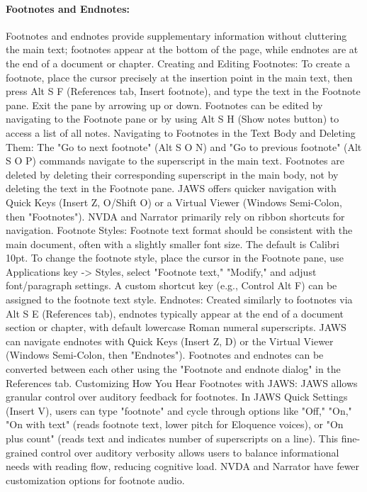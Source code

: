 \paragraph{Footnotes and Endnotes:}
Footnotes and endnotes provide supplementary information without cluttering the main text; footnotes appear at the bottom of the page, while endnotes are at the end of a document or chapter.\supercite{kingsbury2025}
Creating and Editing Footnotes: To create a footnote, place the cursor precisely at the insertion point in the main text, then press Alt S F (References tab, Insert footnote), and type the text in the Footnote pane. Exit the pane by arrowing up or down.\supercite{kingsbury2025} Footnotes can be edited by navigating to the Footnote pane or by using Alt S H (Show notes button) to access a list of all notes.\supercite{kingsbury2025}
Navigating to Footnotes in the Text Body and Deleting Them: The "Go to next footnote" (Alt S O N) and "Go to previous footnote" (Alt S O P) commands navigate to the superscript in the main text. Footnotes are deleted by deleting their corresponding superscript in the main body, not by deleting the text in the Footnote pane.\supercite{kingsbury2025} JAWS offers quicker navigation with Quick Keys (Insert Z, O/Shift O) or a Virtual Viewer (Windows Semi-Colon, then "Footnotes").\supercite{kingsbury2025} NVDA and Narrator primarily rely on ribbon shortcuts for navigation.\supercite{kingsbury2025}
Footnote Styles: Footnote text format should be consistent with the main document, often with a slightly smaller font size. The default is Calibri 10pt.\supercite{kingsbury2025} To change the footnote style, place the cursor in the Footnote pane, use Applications key -\textgreater{} Styles, select "Footnote text," "Modify," and adjust font/paragraph settings.\supercite{kingsbury2025} A custom shortcut key (e.g., Control Alt F) can be assigned to the footnote text style.\supercite{kingsbury2025}
Endnotes: Created similarly to footnotes via Alt S E (References tab), endnotes typically appear at the end of a document section or chapter, with default lowercase Roman numeral superscripts.\supercite{kingsbury2025} JAWS can navigate endnotes with Quick Keys (Insert Z, D) or the Virtual Viewer (Windows Semi-Colon, then "Endnotes").\supercite{kingsbury2025} Footnotes and endnotes can be converted between each other using the "Footnote and endnote dialog" in the References tab.\supercite{kingsbury2025}
Customizing How You Hear Footnotes with JAWS: JAWS allows granular control over auditory feedback for footnotes. In JAWS Quick Settings (Insert V), users can type "footnote" and cycle through options like "Off," "On," "On with text" (reads footnote text, lower pitch for Eloquence voices), or "On plus count" (reads text and indicates number of superscripts on a line).\supercite{kingsbury2025} This fine-grained control over auditory verbosity allows users to balance informational needs with reading flow, reducing cognitive load. NVDA and Narrator have fewer customization options for footnote audio.\supercite{kingsbury2025}
